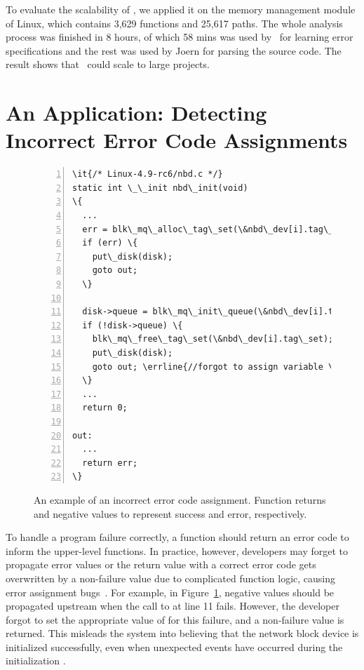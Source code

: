 \documentclass[12pt]{report}	%
\begin{document}
To evaluate the scalability of \newTool,
we applied it on the memory management module of Linux,
which contains 3,629 functions and 25,617 paths.
The whole analysis process was finished in 8 hours, of which
58 mins was used by \newTool\ for learning error specifications and
the rest was used by Joern for parsing the source code.
The result shows that \newTool\ could scale to large projects.

\section{An Application: Detecting Incorrect Error Code Assignments}
\label{sec:app:evalbugs}

\begin{figure}[t]
\begin{Verbatim}[numbers=left,xleftmargin=6mm,fontsize=\footnotesize,
    commandchars=\\\{\}]
\it{/* Linux-4.9-rc6/nbd.c */}
static int \_\_init nbd\_init(void)
\{
  ...
  err = blk\_mq\_alloc\_tag\_set(\&nbd\_dev[i].tag\_set);
  if (err) \{
    put\_disk(disk);
    goto out;
  \}

  disk->queue = blk\_mq\_init\_queue(\&nbd\_dev[i].tag\_set);
  if (!disk->queue) \{
    blk\_mq\_free\_tag\_set(\&nbd\_dev[i].tag\_set);
    put\_disk(disk);
    goto out; \errline{//forgot to assign variable \it{err}} \errline{with correct error value.}
  \}
  ...
  return 0;

out:
  ...
  return err;
\}
\end{Verbatim}
\caption[An example of an incorrect error code assignment]{An example of an incorrect error code assignment.
Function  returns  and negative values to represent success and error, respectively.}
\label{fig:errbug}
\end{figure}

To handle a program failure correctly, a function should return an error code
to inform the upper-level functions.
In practice, however, developers may forget to propagate error values
or the return value with a correct error code gets 
overwritten by a non-failure value due to complicated function logic,
causing error assignment bugs~\cite{gunawi2008eio,liang2016antminer,Tian:2017:ADR}.
For example, in Figure~\ref{fig:errbug}, 
negative values should be propagated upstream when the call to
 at line 11 fails.
However, the developer forgot to set the appropriate value of  
for this failure, and a non-failure value  is returned.
This misleads the system into believing that the network block device is initialized successfully, 
even when unexpected events have occurred during the initialization  . 
%
\end{document}
